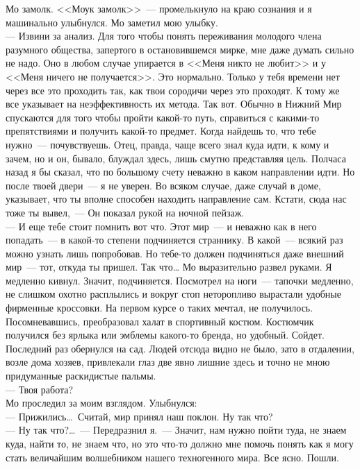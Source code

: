 Мо замолк. <<Моук замолк>>~--- промелькнуло на краю сознания и я машинально 
улыбнулся. Мо заметил мою улыбку.\\
--- Извини за анализ. Для того чтобы понять переживания молодого члена разумного 
общества, запертого в остановившемся мирке, мне даже думать сильно не надо. Оно 
в любом случае упирается в <<Меня никто не любит>> и у <<Меня ничего не 
получается>>. Это нормально. Только у тебя времени нет через все это проходить 
так, как твои сородичи через это проходят. К тому же все указывает на 
неэффективность их метода. Так вот. Обычно в Нижний Мир спускаются для того 
чтобы пройти какой-то путь, справиться с какими-то препятствиями и получить 
какой-то предмет. Когда найдешь то, что тебе нужно~--- почувствуешь. Отец, 
правда, 
чаще всего знал куда идти, к кому и зачем, но и он, бывало, блуждал здесь, лишь 
смутно представляя цель. Полчаса назад я бы сказал, что по большому счету 
неважно в каком направлении идти. Но после твоей двери~--- я не уверен. Во 
всяком 
случае, даже случай в доме, указывает, что ты вполне способен находить 
направление сам. Кстати, сюда нас тоже ты вывел,~--- Он показал рукой на ночной 
пейзаж.\\
--- И еще тебе стоит помнить вот что. Этот мир~--- и неважно как в него 
попадать~--- в какой-то степени подчиняется страннику. В какой~--- всякий раз можно узнать 
лишь попробовав. Но тебе-то должен подчиняться даже внешний мир~--- тот, откуда ты 
пришел. Так что\ldots
Мо выразительно развел руками. Я медленно кивнул. Значит, подчиняется. 
Посмотрел 
на ноги~--- тапочки медленно, не слишком охотно расплылись и вокруг стоп 
неторопливо вырастали удобные фирменные кроссовки. На первом курсе о таких 
мечтал, не получилось. Посомневавшись, преобразовал халат в спортивный костюм. 
Костюмчик получился без ярлыка или эмблемы какого-то бренда, но удобный. 
Сойдет. 
Последний раз обернулся на сад. Людей отсюда видно не было, зато в отдалении, 
возле дома хозяев, привлекали глаз две явно лишние здесь и точно не мною 
придуманные раскидистые пальмы.\\
--- Твоя работа?\\
Мо проследил за моим взглядом. Улыбнулся:\\
--- Прижились\ldots\ Считай, мир принял наш поклон. Ну так что?\\
--- Ну так что?\ldots~--- Передразнил я.~--- Значит, нам нужно пойти туда, не 
знаем куда, найти то, не знаем что, но это что-то должно мне помочь понять как я могу стать 
величайшим волшебником нашего техногенного мира. Все ясно. Пошли. 

